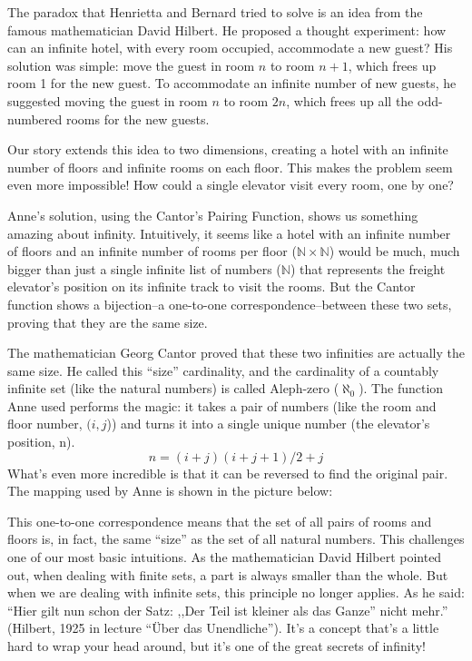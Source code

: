 The paradox that Henrietta and Bernard tried to solve is an idea from the famous mathematician David Hilbert. He proposed a thought experiment: how can an infinite hotel, with every room occupied, accommodate a new guest? His solution was simple: move the guest in room $n$ to room $n+1$, which frees up room 1 for the new guest. To accommodate an infinite number of new guests, he suggested moving the guest in room $n$ to room $2n$, which frees up all the odd-numbered rooms for the new guests.

Our story extends this idea to two dimensions, creating a hotel with an infinite number of floors and infinite rooms on each floor. This makes the problem seem even more impossible! How could a single elevator visit every room, one by one?

Anne's solution, using the Cantor's Pairing Function, shows us something amazing about infinity. Intuitively, it seems like a hotel with an infinite number of floors and an infinite number of rooms per floor ($\mathbb{N}\times\mathbb{N}$) would be much, much bigger than just a single infinite list of numbers ($\mathbb{N}$) that represents the freight elevator's position on its infinite track to visit the rooms. But the Cantor function shows a bijection--a one-to-one correspondence--between these two sets, proving that they are the same size.

The mathematician Georg Cantor proved that these two infinities are actually the same size. He called this ``size'' cardinality, and the cardinality of a countably infinite set (like the natural numbers) is called Aleph-zero ($\aleph_0$). The function Anne used performs the magic: it takes a pair of numbers (like the room and floor number, $(i,j$)) and turns it into a single unique number (the elevator's position, n). 
$$n=(i+j)(i+j+1)/2+j$$
What's even more incredible is that it can be reversed to find the original pair.
The mapping used by Anne is shown in the picture below:

\begin{center}

\end{center}


This one-to-one correspondence means that the set of all pairs of rooms and floors is, in fact, the same ``size'' as the set of all natural numbers. This challenges one of our most basic intuitions. As the mathematician David Hilbert pointed out, when dealing with finite sets, a part is always smaller than the whole. But when we are dealing with infinite sets, this principle no longer applies. As he said: ``Hier gilt nun schon der Satz: ,,Der Teil ist kleiner als das Ganze'' nicht mehr.'' (Hilbert, 1925 in lecture ``\"{U}ber das Unendliche''). It's a concept that's a little hard to wrap your head around, but it's one of the great secrets of infinity!
